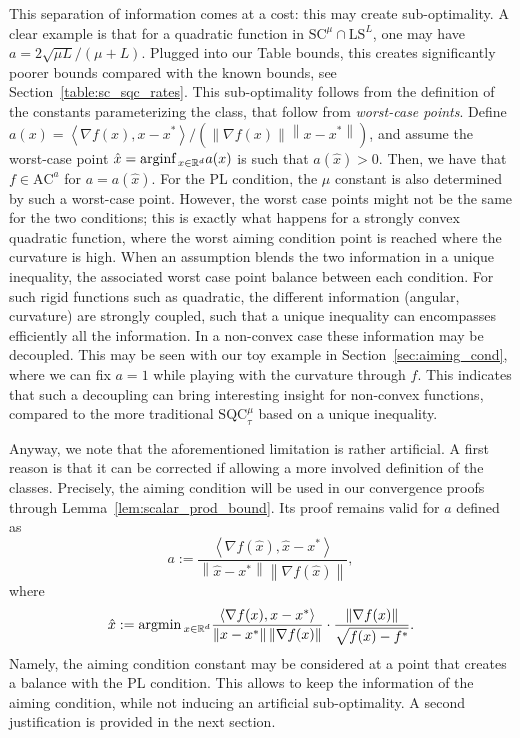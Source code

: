 \documentclass{article}
\def\R{{\mathbb{R}}}
\newcommand{\norm}[1]{\left\lVert#1\right\rVert}
\newcommand{\dotprod}[1]{\left< #1\right>}
\newcommand{\sqc}{\text{SQC}_{\tau}^{\mu}}
\newcommand{\ls}{\text{LS}^{L}}
\newcommand{\strongconv}{\text{SC}^{\mu}}
\newcommand{\ac}{\text{AC}^{a}}
\def\argmin{\textup{argmin}\,}
\def\arginf{\textup{arginf}\,}
\theoremstyle{plain}
\theoremstyle{definition}
\theoremstyle{remark}
\begin{document}
This separation of information comes at a cost: this may create sub-optimality. A clear example is that for a quadratic function in $\strongconv \cap \ls$, one may have $a=2\sqrt{\mu L}/(\mu+L)$. Plugged into our Table bounds, this creates significantly poorer bounds compared with the known bounds, see Section~\ref{table:sc_sqc_rates}. This sub-optimality follows from the definition of the constants parameterizing the class, that follow from \textit{worst-case points}. Define $a(x) = \dotprod{\nabla f(x),x-x^\ast}/({\norm{\nabla f(x)}\norm{x-x^\ast}})$, and assume the worst-case point $\hat{x} = \arginf_{x \in \R^d} a(x)$ is such that $a(\hat x) > 0$. Then, we have that $f \in \ac$ for $a = a(\hat x)$. For the PL condition, the $\mu$ constant is also determined by such a worst-case point. However, the worst case points might not be the same for the two conditions; this is exactly what happens for a strongly convex quadratic function, where the worst aiming condition point is reached where the curvature is high. When an assumption blends the two information in a unique inequality, the associated worst case point balance between each condition. For such rigid functions such as quadratic, the different information (angular, curvature) are strongly coupled, such that a unique inequality can encompasses efficiently all the information. In a non-convex case these information may be decoupled. This may be seen with our toy example  in Section~\ref{sec:aiming_cond}, where we can fix $a=1$ while playing with the curvature through $f$. This indicates that such a decoupling can bring interesting insight for non-convex functions, compared to the more traditional $\sqc$ based on a unique inequality.    




Anyway, we note that the aforementioned limitation is rather artificial. A first reason is that it can be corrected if allowing a more involved definition of the classes. Precisely, the aiming condition will be used in our convergence proofs through Lemma~\ref{lem:scalar_prod_bound}. Its proof remains valid for $a$ defined as  \[a := \frac{\dotprod{\nabla f(\hat x),\hat x-x^\ast}}{\norm{\hat x-x^\ast}\norm{\nabla f(\hat x)}},\]  where
 \[\hat{x} :=\argmin_{x \in \R^d }\frac{\dotprod{\nabla f(x),x-x^\ast}}{\norm{x-x^\ast}\norm{\nabla f(x)}} \cdot \frac{\norm{\nabla f(x)}}{\sqrt{f(x)-f^\ast}}.\]
 Namely, the aiming condition constant may be considered at a point that creates a balance with the PL condition. This allows to keep the information of the aiming condition, while not inducing an artificial sub-optimality. A second justification is provided in the next section.
\end{document}
